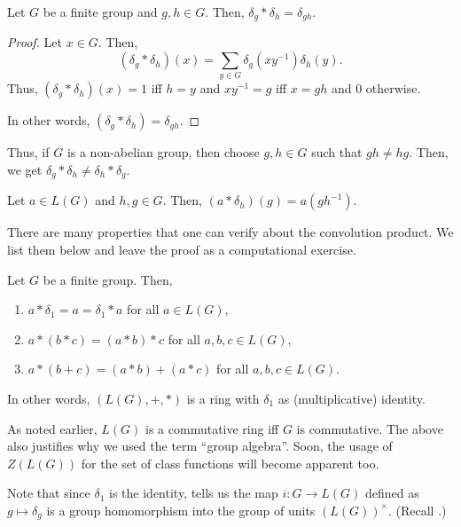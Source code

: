 \documentclass[12pt]{article}	%
\begin{document}
\begin{prop} \label{prop:convdeltaprod}
    Let $G$ be a finite group and $g, h \in G.$ Then, $\delta_g * \delta_h = \delta_{gh}.$
\end{prop}
\begin{proof}
    Let $x \in G.$ Then,
    \begin{equation*}
        (\delta_g * \delta_h)(x) = \sum_{y \in G} \delta_g(xy^{-1})\delta_h(y).
    \end{equation*}
    Thus, $(\delta_g * \delta_h)(x) = 1$ iff $h = y$ and $xy^{-1} = g$ iff $x = gh$ and $0$ otherwise.
    
    In other words, $(\delta_g * \delta_h) = \delta_{gh}.$
\end{proof}

Thus, if $G$ is a non-abelian group, then choose $g, h \in G$ such that $gh \neq hg.$ Then, we get $\delta_g * \delta_h \neq \delta_h * \delta_g.$ 

\begin{prop} \label{prop:convole}
    Let $a \in L(G)$ and $h, g \in G.$ Then, $(a * \delta_h)(g) = a(gh^{-1}).$
\end{prop}

There are many properties that one can verify about the convolution product. We list them below and leave the proof as a computational exercise.

\begin{prop}
    Let $G$ be a finite group. Then,
    \begin{enumerate}
        \item $a * \delta_1 = a = \delta_1 * a$ for all $a \in L(G),$
        \item $a * (b * c) = (a * b) * c$ for all $a, b, c \in L(G),$
        \item $a * (b + c) = (a * b) + (a * c)$ for all $a, b, c \in L(G).$
    \end{enumerate}
    In other words, $(L(G), +, *)$ is a ring with $\delta_1$ as (multiplicative) identity.
\end{prop}

As noted earlier, $L(G)$ is a commutative ring iff $G$ is commutative. The above also justifies why we used the term ``group algebra''. Soon, the usage of $Z(L(G))$ for the set of class functions will become apparent too.

\begin{rem}
    Note that since $\delta_1$ is the identity,  tells us the map $i : G \to L(G)$ defined as $g \mapsto \delta_g$ is a group homomorphism into the group of units $(L(G))^\times.$ (Recall .)
\end{rem}
\end{document}
